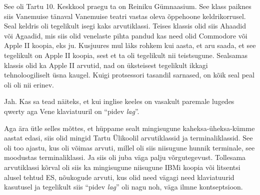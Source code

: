 See oli Tartu 10. Keskkool praegu ta on 
Reiniku Gümnaasium. See klass paiknes siis  Vanemuise tänaval Vanemuise teatri vastas 
oleva õppehoone keldrikorrusel. 
Seal keldris oli tegelikult isegi kaks arvutiklassi. Teises klassis olid siis 
Ahaadid või Agaadid, mis siis olid venelaste pihta pandud 
kas need olid Commodore  või Apple II koopia, eks ju. Kusjuures mul läks rohkem 
kui aasta, et aru saada, et see tegelikult on Apple II koopia, sest et ta oli 
tegelikult nii teistsugune. Sealsamas klassis olid ka Apple 
II arvutid,  nad on üksteisest tegelikult ikkagi 
tehnoloogiliselt üsna kaugel. Kuigi protsessori tasandil sarnased, on  kõik 
seal peal oli oli nii erinev. 


Jah. Kas sa tead näiteks, et kui inglise keeles on vasakult paremale lugedes 
qwerty aga Vene klaviatuuril on \enquote{pidev \emph{lag}}. 


Aga ära ütle selles mõttes, et hüppame sealt mingisugune kaheksa-üheksa-kümme 
aastat edasi, siis olid mingid Tartu Ülikoolil arvutiklassid ja 
terminaliklassid. See oli too ajastu, kus oli võimas arvuti, millel oli siis 
niisugune hunnik terminale, see moodustas terminaliklassi. Ja siis oli juba 
väga palju võrgutegevust. Tollesama arvutiklassi kõrval oli siis ka mingisugune 
niisugune IBMi koopia või litsentsi alusel tehtud ES, nõukogude arvuti, kus olid need 
vägagi need klaviatuurid kasutusel ja tegelikult siis \enquote{pidev 
\emph{lag}} oli nagu noh, väga ilmne kontseptsioon.


